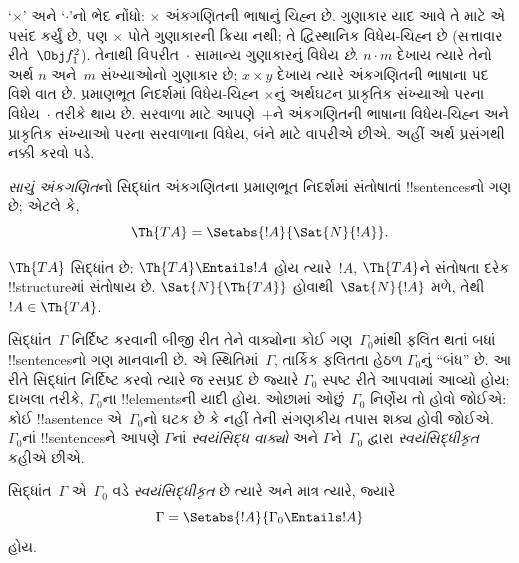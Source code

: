 \documentclass[../../../include/open-logic-section]{subfiles}
\begin{document}
`$\times$' અને `$\cdot$'નો ભેદ નોંધો: $\times$
અંકગણિતની ભાષાનું ચિહ્ન છે. ગુણાકાર યાદ આવે
તે માટે એ પસંદ કર્યું છે, પણ $\times$ પોતે
ગુણાકારની ક્રિયા નથી; તે દ્વિસ્થાનિક વિધેય-ચિહ્ન
છે (સત્તાવાર રીતે~$\Obj f^2_1$). તેનાથી
વિપરીત~$\cdot$ સામાન્ય ગુણાકારનું વિધેય
\emph{છે}. $n \cdot m$ દેખાય ત્યારે તેનો
અર્થ $n$ અને~$m$ સંખ્યાઓનો ગુણાકાર છે;
$x \times y$ દેખાય ત્યારે અંકગણિતની ભાષાના
પદ વિશે વાત છે. પ્રમાણભૂત નિદર્શમાં વિધેય-ચિહ્ન
$\times$નું અર્થઘટન પ્રાકૃતિક સંખ્યાઓ પરના
વિધેય~$\cdot$ તરીકે થાય છે. સરવાળા માટે
આપણે~$+$ને અંકગણિતની ભાષાના વિધેય-ચિહ્ન
અને પ્રાકૃતિક સંખ્યાઓ પરના સરવાળાના વિધેય,
બંને માટે વાપરીએ છીએ. અહીં અર્થ પ્રસંગથી
નક્કી કરવો પડે.

\begin{defn}
\emph{સાચું અંકગણિત}નો સિદ્ધાંત અંકગણિતના
પ્રમાણભૂત નિદર્શમાં સંતોષાતાં !!{sentence}sનો ગણ છે;
એટલે કે,
\[
\Th{TA} = \Setabs{!A}{\Sat{N}{!A}}.
\]
\end{defn}

$\Th{TA}$ સિદ્ધાંત છે: $\Th{TA} \Entails !A$
હોય ત્યારે~$!A$, $\Th{TA}$ને સંતોષતા દરેક
!!{structure}માં સંતોષાય છે. $\Sat{N}{\Th{TA}}$
હોવાથી~$\Sat{N}{!A}$ મળે, તેથી
$!A \in \Th{TA}$.

સિદ્ધાંત~$\Gamma$ નિર્દિષ્ટ કરવાની બીજી રીત
તેને વાક્યોના કોઈ ગણ~$\Gamma_0$માંથી ફલિત
થતાં બધાં !!{sentence}sનો ગણ માનવાની છે.
એ સ્થિતિમાં~$\Gamma$, તાર્કિક ફલિતતા હેઠળ
$\Gamma_0$નું ``બંધ'' છે. આ રીતે સિદ્ધાંત
નિર્દિષ્ટ કરવો ત્યારે જ રસપ્રદ છે જ્યારે
$\Gamma_0$ સ્પષ્ટ રીતે આપવામાં આવ્યો હોય;
દાખલા તરીકે, $\Gamma_0$ના !!{element}sની યાદી હોય.
ઓછામાં ઓછું~$\Gamma_0$ નિર્ણેય તો હોવો
જોઈએ: કોઈ !!a{sentence} એ~$\Gamma_0$નો
ઘટક છે કે નહીં તેની સંગણકીય તપાસ શક્ય હોવી
જોઈએ. $\Gamma_0$નાં !!{sentence}sને આપણે
$\Gamma$નાં \emph{સ્વયંસિદ્ધ વાક્યો} અને
$\Gamma$ને~$\Gamma_0$ દ્વારા
\emph{સ્વયંસિદ્ધીકૃત} કહીએ છીએ.

\begin{defn}
સિદ્ધાંત~$\Gamma$ એ~$\Gamma_0$ વડે
\emph{સ્વયંસિદ્ધીકૃત} છે ત્યારે અને માત્ર ત્યારે,
જ્યારે
\[
\Gamma = \Setabs{!A}{\Gamma_0 \Entails !A}
\]
હોય.
\end{defn}
\end{document}
